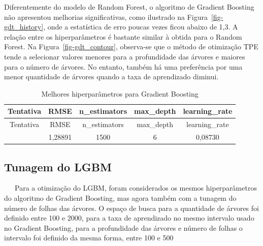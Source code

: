 \documentclass[
  12pt,
  a4paper,
]{scrreprt}
\begin{document}
Diferentemente do modelo de Random Forest, o algoritmo de Gradient
Boosting não apresentou melhorias significativas, como ilustrado na
Figura~\ref{fig-gdt_history}, onde a estatística de erro poucas vezes
ficou abaixo de 1,3. A relação entre os hiperparâmetros é bastante
similar à obtida para o Random Forest. Na Figura~\ref{fig-gdt_contour},
observa-se que o método de otimização TPE tende a selecionar valores
menores para a profundidade das árvores e maiores para o número de
árvores. No entanto, também há uma preferência por uma menor quantidade
de árvores quando a taxa de aprendizado diminui.

\begin{longtable}[]{@{}ccccc@{}}
\caption{Melhores hiperparâmetros para Gradient
Boosting}\label{tbl-params_gdt}\tabularnewline
\toprule\noalign{}
Tentativa & RMSE & n\_estimators & max\_depth & learning\_rate \\
\midrule\noalign{}
\endfirsthead
\toprule\noalign{}
Tentativa & RMSE & n\_estimators & max\_depth & learning\_rate \\
\midrule\noalign{}
\endhead
\bottomrule\noalign{}
\endlastfoot
50 & 1,28891 & 1500 & 6 & 0,08730 \\
\end{longtable}

\subsection{Tunagem do LGBM}\label{tunagem-do-lgbm}

~~~Para a otimização do LGBM, foram considerados os mesmos
hiperparâmetros do algoritmo de Gradient Boosting, mas agora também com
a tunagem do número de folhas das árvores. O espaço de busca para a
quantidade de árvores foi definido entre 100 e 2000, para a taxa de
aprendizado no mesmo intervalo usado no Gradient Boosting, para a
profundidade das árvores e número de folhas o intervalo foi definido da
mesma forma, entre 100 e 500
\end{document}
